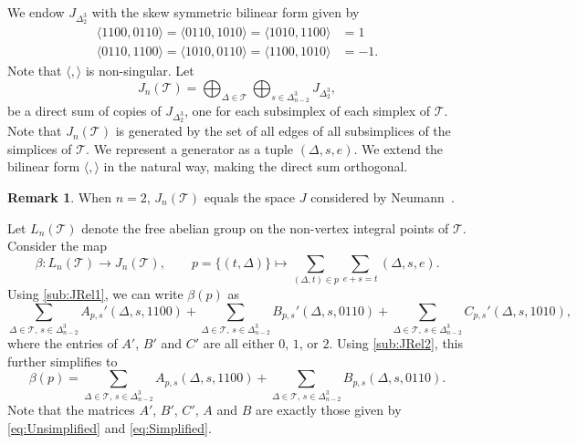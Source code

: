 \documentclass[12pt]{amsart}
\theoremstyle{definition}
\newtheorem{remark}[theorem]{Remark}
\numberwithin{equation}{section}
\def\T{\mathcal{T}}
\begin{document}
We endow $J_{\Delta^3_2}$ with the skew symmetric bilinear form given by
\begin{equation}\label{eq:SymplecticForm}
\begin{aligned}
\langle1100,0110\rangle=\langle0110,1010\rangle=\langle1010,1100\rangle&=1\\
\langle0110,1100\rangle=\langle1010,0110\rangle=\langle1100,1010\rangle&=-1.
\end{aligned}
\end{equation}
Note that $\langle,\rangle$ is non-singular. Let
\begin{equation}
J_n(\T)=\bigoplus_{\Delta\in\T}\bigoplus_{s\in\Delta_{n-2}^3}J_{\Delta_2^3},
\end{equation}
be a direct sum of copies of $J_{\Delta^3_2}$, one for each subsimplex of each simplex of $\T$. Note that $J_n(\T)$ is generated by the set of all edges of all subsimplices of the simplices of $\T$. We represent a generator as a tuple $(\Delta,s,e)$. We extend the bilinear form $\langle,\rangle$ in the natural way, making the direct sum orthogonal. 
\begin{remark} When $n=2$, $J_n(\T)$ equals the space $J$ considered by Neumann~\cite[Section~4]{NeumannComb}.
\end{remark}
Let $L_n(\T)$ denote the free abelian group on the non-vertex integral points of $\T$.
Consider the map
\begin{equation}
\beta\colon L_n(\T)\to J_n(\T),\qquad p=\{(t,\Delta)\}\mapsto\sum_{(\Delta,t)\in p}\sum_{e+s=t}(\Delta,s,e).
\end{equation}
Using \eqref{sub:JRel1}, we can write $\beta(p)$ as
\begin{equation}
\sum_{\Delta\in\T,\,s\in\Delta_{n-2}^3}A_{p,s}'(\Delta,s,1100)+\sum_{\Delta\in\T,\,s\in\Delta_{n-2}^3}B_{p,s}'(\Delta,s,0110)+\sum_{\Delta\in\T,\,s\in\Delta_{n-2}^3}C_{p,s}'(\Delta,s,1010),
\end{equation}
where the entries of $A'$, $B'$ and $C'$ are all either $0$, $1$, or $2$. Using \eqref{sub:JRel2}, this further simplifies to
\begin{equation}\label{eq:Beta}
\beta(p)=\sum_{\Delta\in\T,\,s\in\Delta_{n-2}^3}A_{p,s}(\Delta,s,1100)+\sum_{\Delta\in\T,\,s\in\Delta_{n-2}^3}B_{p,s}(\Delta,s,0110).
\end{equation}
Note that the matrices $A'$, $B'$, $C'$, $A$ and $B$ are exactly those given by \eqref{eq:Unsimplified} and \eqref{eq:Simplified}. %
\end{document}
